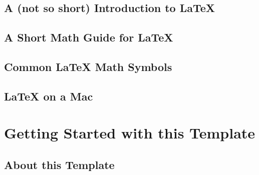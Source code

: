 \subsection{A (not so short) Introduction to \LaTeX{}}


\subsection{A Short Math Guide for \LaTeX{}}


\subsection{Common \LaTeX{} Math Symbols}


\subsection{\LaTeX{} on a Mac}
 

\section{Getting Started with this Template}


\subsection{About this Template}


